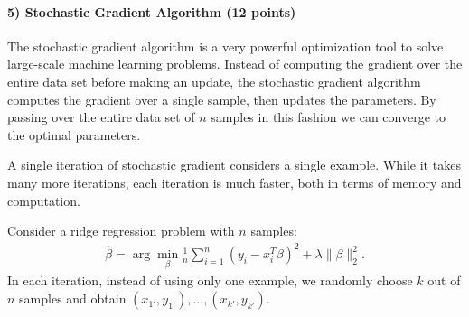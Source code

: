 \documentclass[11pt]{article}
\begin{document}
\paragraph{5) Stochastic Gradient Algorithm (12 points)}

The stochastic gradient algorithm is a very powerful optimization tool to solve large-scale machine learning problems. Instead of computing the gradient over the entire data set before making an update, the stochastic gradient algorithm computes the gradient over a single sample, then updates the parameters. By passing over the entire data set of $n$ samples in this fashion we can converge to the optimal parameters.

A single iteration of stochastic gradient considers a single example.
While it takes many more iterations, each iteration is much faster, both in terms of memory and computation.

Consider a ridge regression problem with $n$ samples:
\begin{align}
\hat{\beta} = \arg\min_{\beta}\frac{1}{n}\sum_{i=1}^n(y_i - x_i^T\beta)^2 + \lambda\|\beta\|_2^2.
\end{align}
In each iteration, instead of using only one example, we randomly choose $k$ out of $n$ samples and obtain $(x_{1'},y_{1'}),...,(x_{k'},y_{k'})$. 
\end{document}
